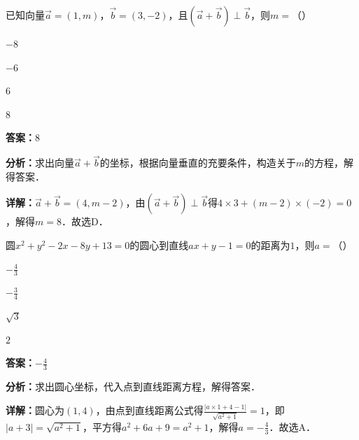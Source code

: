 \begin{question}[points=5]
已知向量$\overrightarrow{a}=(1,m)$，$\overrightarrow{b}=(3,-2)$，且$(\overrightarrow{a}+\overrightarrow{b})\perp\overrightarrow{b}$，则$m=$（\quad）
\begin{choices}
  \item $-8$
  \item $-6$
  \item $6$
  \item $8$
\end{choices}
\begin{solution}
\textbf{答案：}$8$

\textbf{分析：}求出向量$\overrightarrow{a}+\overrightarrow{b}$的坐标，根据向量垂直的充要条件，构造关于$m$的方程，解得答案．

\textbf{详解：}$\overrightarrow{a}+\overrightarrow{b}=(4,m-2)$，由$(\overrightarrow{a}+\overrightarrow{b})\perp\overrightarrow{b}$得$4\times3+(m-2)\times(-2)=0$，解得$m=8$．故选D．
\end{solution}
\end{question}

\begin{question}[points=5]
圆$x^2+y^2-2x-8y+13=0$的圆心到直线$ax+y-1=0$的距离为$1$，则$a=$（\quad）
\begin{choices}
  \item $-\frac{4}{3}$
  \item $-\frac{3}{4}$
  \item $\sqrt{3}$
  \item $2$
\end{choices}
\begin{solution}
\textbf{答案：}$-\frac{4}{3}$

\textbf{分析：}求出圆心坐标，代入点到直线距离方程，解得答案．

\textbf{详解：}圆心为$(1,4)$，由点到直线距离公式得$\frac{|a\times1+4-1|}{\sqrt{a^2+1}}=1$，即$|a+3|=\sqrt{a^2+1}$，平方得$a^2+6a+9=a^2+1$，解得$a=-\frac{4}{3}$．故选A．
\end{solution}
\end{question}

